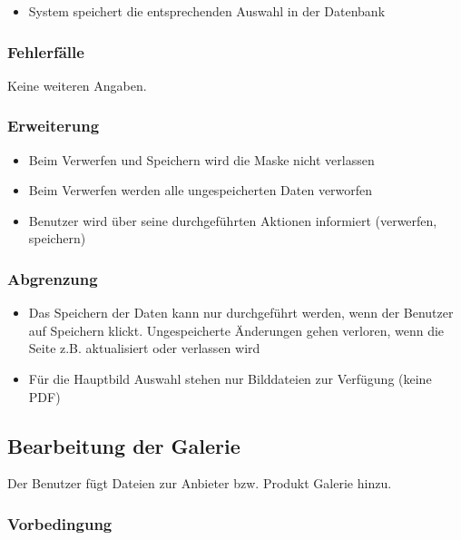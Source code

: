 \documentclass[a4paper,12pt]{article}
\begin{document}
\begin{itemize}

\item
  System speichert die entsprechenden Auswahl in der Datenbank
\end{itemize}

\subsubsection{Fehlerfälle}\label{fehlerfalle-4}
Keine weiteren Angaben.

\subsubsection{Erweiterung}\label{erweiterung-4}

\begin{itemize}

\item
  Beim Verwerfen und Speichern wird die Maske nicht verlassen
\item
  Beim Verwerfen werden alle ungespeicherten Daten verworfen
\item
  Benutzer wird über seine durchgeführten Aktionen informiert
  (verwerfen, speichern)
\end{itemize}

\subsubsection{Abgrenzung}\label{abgrenzung-4}

\begin{itemize}

\item
  Das Speichern der Daten kann nur durchgeführt werden, wenn der
  Benutzer auf Speichern klickt. Ungespeicherte Änderungen gehen
  verloren, wenn die Seite z.B. aktualisiert oder verlassen wird
\item
  Für die Hauptbild Auswahl stehen nur Bilddateien zur Verfügung (keine
  PDF)
\end{itemize}

\subsection{Bearbeitung der Galerie}
Der Benutzer fügt Dateien zur Anbieter bzw. Produkt Galerie hinzu.

\subsubsection{Vorbedingung}\label{vorbedingung-5}
\end{document}
